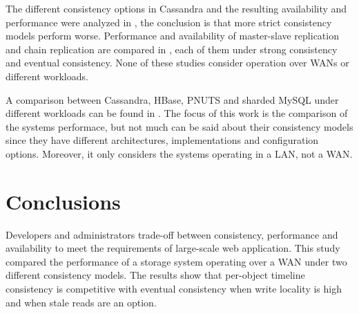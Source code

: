 \documentclass[doublespacing]{bmcart}
\begin{document}
The different consistency options in Cassandra and the resulting availability
and performance were analyzed in \cite{Beyer2011}, the conclusion is that
more strict consistency models perform worse. Performance and availability of
master-slave replication and chain replication are compared in
\cite{vanRenesse2004}, each of them under strong consistency and eventual
consistency. None of these studies consider operation over WANs or different
workloads.

A comparison between Cassandra, HBase, PNUTS and sharded MySQL under different
workloads can be found in \cite{Cooper2010}. The focus of this work is the
comparison of the systems performace, but not much can be said about their
consistency models since they have different architectures, implementations and
configuration options. Moreover, it only considers the systems operating in a
LAN, not a WAN.

\section{Conclusions}

Developers and administrators trade-off between consistency, performance and
availability to meet the requirements of large-scale web application. This
study compared the performance of a storage system operating over a WAN under
two different consistency models. The results show that per-object timeline
consistency is competitive with eventual consistency when write locality is
high and when stale reads are an option.

\end{document}
